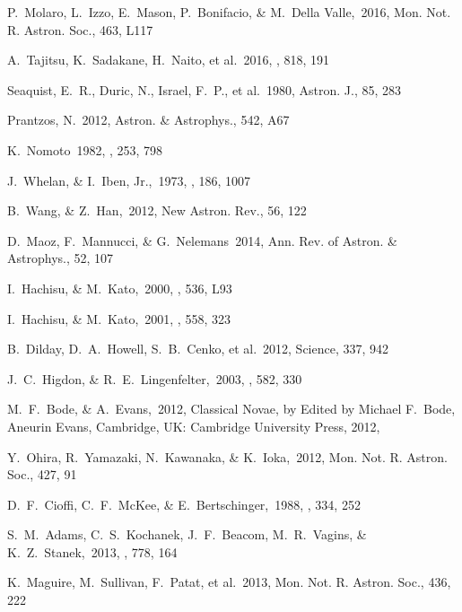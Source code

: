 \documentclass[twocolumn,showpacs,amsmath,amssymb]{revtex4-1}
\begin{document}
\begin{thebibliography}{99}
P.~Molaro, L.~Izzo, E.~Mason, P.~Bonifacio, \& M.~Della Valle,\ 2016, Mon. Not. R. Astron. Soc., 463, L117

A.~Tajitsu, K.~Sadakane, H.~Naito, et al.\ 2016, \apj, 818, 191    

Seaquist, E.~R., Duric, N., Israel, F.~P., et al.\ 1980, Astron. J., 85, 283 
  
Prantzos, N.\ 2012, Astron. \& Astrophys., 542, A67   
  
K.~Nomoto\ 1982, \apj, 253, 798  
  
J.~Whelan, \& I.~Iben, Jr.,\ 1973, \apj, 186, 1007   

B.~Wang, \& Z.~Han,\ 2012, New Astron. Rev., 56, 122 

D.~Maoz, F.~Mannucci, \& G.~Nelemans\ 2014, Ann. Rev. of Astron. \& Astrophys., 52, 107 

I.~Hachisu, \& M.~Kato,\ 2000, \apj, 536, L93

I.~Hachisu, \& M.~Kato,\ 2001, \apj, 558, 323 
  
B.~Dilday, D.~A.~Howell, S.~B.~Cenko, et al.\ 2012, Science, 337, 942 

J.~C.~Higdon, \& R.~E.~Lingenfelter,\ 2003, \apj, 582, 330 
  
M.~F.~Bode, \& A.~Evans,\ 2012, Classical Novae, by Edited by Michael F.~Bode, Aneurin Evans, Cambridge, UK: Cambridge University Press, 2012,    
  
Y.~Ohira, R.~Yamazaki, N.~Kawanaka, \& K.~Ioka,\ 2012, Mon. Not. R. Astron. Soc., 427, 91 

D.~F.~Cioffi, C.~F.~McKee, \& E.~Bertschinger,\ 1988, \apj, 334, 252 

S.~M.~Adams, C.~S.~Kochanek, J.~F.~Beacom, M.~R.~Vagins, \& K.~Z.~Stanek,\ 2013, \apj, 778, 164 

K.~Maguire, M.~Sullivan, F.~Patat, et al.\ 2013, Mon. Not. R. Astron. Soc., 436, 222 


\end{thebibliography}
\end{document}
